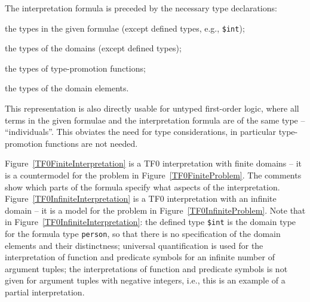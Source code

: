 \documentclass{easychair}
\newcommand{\smalltt}[1]{\small \texttt{#1}}
\newenvironment{packed_itemize}{
\vspace*{-0.2em}
\begin{itemize}
\setlength{\partopsep}{0pt}
\setlength{\itemsep}{1pt}
\setlength{\parskip}{0pt}
\setlength{\parsep}{0pt}
}{\end{itemize}}
\begin{document}
The interpretation formula is preceded by the necessary type declarations:
\begin{packed_itemize}
\item the types in the given formulae (except defined types, e.g., {\smalltt{\$int}});
\item the types of the domains (except defined types);
\item the types of type-promotion functions;
\item the types of the domain elements.
\end{packed_itemize}
This representation is also directly usable for untyped first-order logic, where all terms in 
the given formulae and the interpretation formula are of the same type – ``individuals''. 
This obviates the need for type considerations, in particular type-promotion functions are not 
needed.

Figure~\ref{TF0FiniteInterpretation} is a TF0 interpretation with finite domains -- it is a 
countermodel for the problem in Figure~\ref{TF0FiniteProblem}.
The comments show which parts of the formula specify what aspects of the interpretation.
Figure~\ref{TF0InfiniteInterpretation} is a TF0 interpretation with an infinite domain -- it 
is a model for the problem in Figure~\ref{TF0InfiniteProblem}.
Note that in Figure~\ref{TF0InfiniteInterpretation}:
the defined type {\smalltt{\$int}} is the domain type for the formula type 
{\smalltt{person}}, so that there is no specification of the domain elements and their 
distinctness;
universal quantification is used for the interpretation of function and predicate
symbols for an infinite number of argument tuples;
the interpretations of function and predicate symbols is not given for argument 
tuples with negative integers, i.e., this is an example of a partial interpretation.
\end{document}
